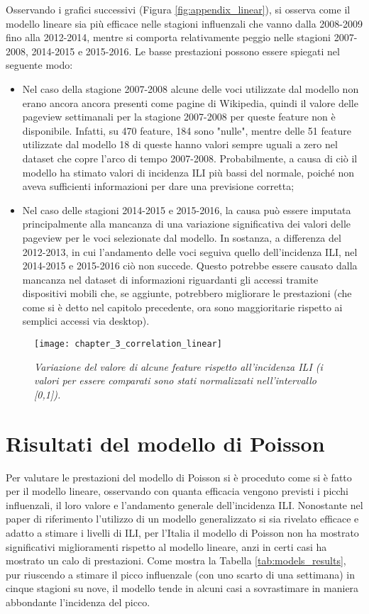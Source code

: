 Osservando i grafici successivi (Figura \ref{fig:appendix_linear}), si osserva come il modello lineare sia più efficace 
nelle stagioni influenzali che vanno dalla 2008-2009 fino alla 2012-2014, mentre si comporta relativamente peggio nelle 
stagioni 2007-2008, 2014-2015 e 2015-2016. Le basse prestazioni possono essere spiegati nel seguente modo: 
\begin{itemize}
\item Nel caso della stagione 2007-2008 alcune delle voci utilizzate dal modello non erano ancora ancora presenti come 
pagine di Wikipedia, quindi il valore delle pageview settimanali per la stagione 2007-2008 per queste feature non è 
disponibile. Infatti, su 470 feature, 184 sono "nulle", mentre delle 51 feature utilizzate dal modello 18 di queste hanno 
valori sempre uguali a zero nel dataset che copre l'arco di tempo 2007-2008. Probabilmente, a causa di ciò il modello ha 
stimato valori di incidenza ILI più bassi del normale, poiché non aveva sufficienti informazioni per dare una previsione 
corretta;
\item Nel caso delle stagioni 2014-2015 e 2015-2016, la causa può essere imputata principalmente alla mancanza di una 
variazione significativa dei valori delle pageview per le voci selezionate dal modello. In sostanza, a differenza del 
2012-2013, in cui l'andamento delle voci seguiva quello dell'incidenza ILI, nel 2014-2015 e 2015-2016 ciò non succede. 
Questo potrebbe essere causato dalla mancanza nel dataset di informazioni riguardanti gli accessi tramite dispositivi mobili 
che, se aggiunte, potrebbero migliorare le prestazioni (che come si è detto nel capitolo precedente, ora sono maggioritarie 
rispetto ai semplici accessi via desktop).
\end{itemize}

\begin{figure}[ht]
\texttt{[image: chapter\_3\_correlation\_linear]}
\caption{\textit{Variazione del valore di alcune feature rispetto all'incidenza ILI (i valori per essere comparati sono stati normalizzati nell'intervallo [0,1]).}}
\label{fig:ch_3_correlation_linear}
\centering
\end{figure}

\section{Risultati del modello di Poisson}
\bigskip

Per valutare le prestazioni del modello di Poisson si è proceduto come si è fatto per il modello lineare, osservando 
con quanta efficacia vengono previsti i picchi influenzali, il loro valore e l'andamento generale dell'incidenza ILI. 
Nonostante nel paper di riferimento \cite{McIver2014} l'utilizzo di un modello generalizzato si sia rivelato efficace e 
adatto a stimare i livelli di ILI, per l'Italia il modello di Poisson non ha mostrato significativi miglioramenti rispetto al 
modello lineare, anzi in certi casi ha mostrato un calo di prestazioni. Come mostra la Tabella 
\ref{tab:models_results}, pur riuscendo a stimare il picco influenzale (con uno scarto di una settimana) in cinque 
stagioni su nove, il modello tende in alcuni casi a sovrastimare in maniera abbondante l'incidenza del picco.
\bigskip

